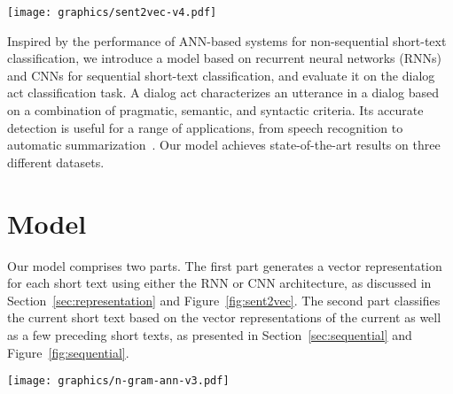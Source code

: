 \documentclass[11pt,letterpaper]{article}
\begin{document}
\begin{figure*}[!ht]
  \centering
      \texttt{[image: graphics/sent2vec-v4.pdf]}
\vspace{-0.0cm}
  \caption{RNN (left) and CNN (right) architectures for generating the vector representation  of a short text . For CNN, Conv refers to convolution operations, and the filter height  is used in this figure.\vspace{-0.1cm}}
  \label{fig:sent2vec}
\end{figure*}


Inspired by the performance of ANN-based systems for non-sequential short-text classification, we introduce a model based on recurrent neural networks (RNNs) and CNNs for sequential short-text classification, and evaluate it on the dialog act classification task.
A dialog act characterizes an utterance in a dialog based on a combination of pragmatic, semantic, and syntactic criteria. Its accurate detection is useful for a range of applications, from speech recognition to automatic summarization~\cite{stolcke2000dialogue}. Our model achieves state-of-the-art results on three different datasets.

 
\section{Model} \label{sec:model}
Our model comprises two parts. The first part generates a vector representation for each short text using either the RNN or CNN architecture, as discussed in Section~\ref{sec:representation} and Figure~\ref{fig:sent2vec}. The second part classifies the current short text based on the vector representations of the current as well as a few preceding short texts, as presented in Section~\ref{sec:sequential} and Figure~\ref{fig:sequential}.

\begin{figure*}[!ht]
  \centering
      \texttt{[image: graphics/n-gram-ann-v3.pdf]}
\vspace{0.1cm}
  \caption{Four instances of the two-layer feedforward ANN used for predicting the probability distribution over the classes  for the  short-text . S2V stands for short text to vector, which is the RNN/CNN architecture that generates  from . From left to right, the history sizes  are  and .  corresponds to the non-sequential classification case.\vspace{-0.2cm}}
  \label{fig:sequential}
\end{figure*}
\end{document}
